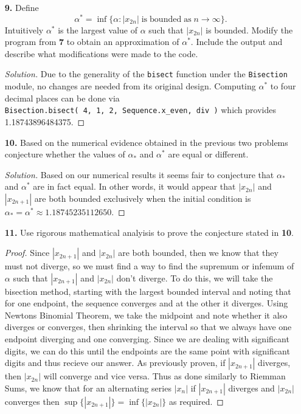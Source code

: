 \documentclass[ 12pt ]{article}
\begin{document}
\begin{enumerate}
	\item[\textbf{9.}] Define $$\alpha^* = \inf \{ \alpha : |x_{2n}|\; \mathrm{is\; bounded\; as}\; n \to \infty \}.$$ Intuitively $\alpha^*$ is the largest value of $\alpha$ such that
		$|x_{2n}|$ is bounded. Modify the program from \textbf{7} to obtain an approximation of $\alpha^*$. Include the output and describe what modifications were made to the code.

		\begin{proof}[Solution]\renewcommand{\qedsymbol}{}
			Due to the generality of the \verb|bisect| function under the \verb|Bisection| module, no changes are needed from its original design. Computing $\alpha^*$ to four decimal
			places can be done via \\ \verb|Bisection.bisect( 4, 1, 2, Sequence.x_even, div )| which provides 1.18743896484375.
		\end{proof}


	\item[\textbf{10.}] Based on the numerical evidence obtained in the previous two problems conjecture whether the values of $\alpha_*$ and $\alpha^*$ are equal or different.

		\begin{proof}[Solution]\renewcommand{\qedsymbol}{}
			Based on our numerical results it seems fair to conjecture that $\alpha_*$ and $\alpha^*$ are in fact equal. In other words, it would appear that $|x_{2n}|$ and $|x_{2n+1}|$
			are both bounded exclusively when the initial condition is $\alpha_* = \alpha^* \approx 1.18745235112650$.
		\end{proof}


	\item[\textbf{11.}] Use rigorous mathematical analyisis to prove the conjecture stated in \textbf{10}.

		\begin{proof}
			Since $|x_{2n+1}|$ and $|x_{2n}|$ are both bounded, then we know that they must not diverge, so we must find a way to find the supremum or infemum of $\alpha$ such that $|x_{2n+1}|$ and $|x_{2n}|$ don't diverge. To do this, we will take the bisection method, starting with the largest bounded interval and noting that for one endpoint, the sequence converges and at the other it diverges. Using Newtons Binomial Theorem, we take the midpoint and note whether it also diverges or converges, then shrinking the interval so that we always have one endpoint diverging and one converging. Since we are dealing with significant digits, we can do this until the endpoints are the same point with significant digits and thus recieve our answer. As previously proven, if $|x_{2n+1}|$ diverges, then $|x_{2n}|$ will converge and vice versa. Thus as done similarly to Riemman Sums, we know that for an alternating series $|x_n|$ if $|x_{2n+1}|$ diverges and $|x_{2n}|$ converges then $\sup\{|x_{2n+1}|\}=\inf\{|x_{2n}|\}$ as required.
		\end{proof}

\end{enumerate}
\end{document}
